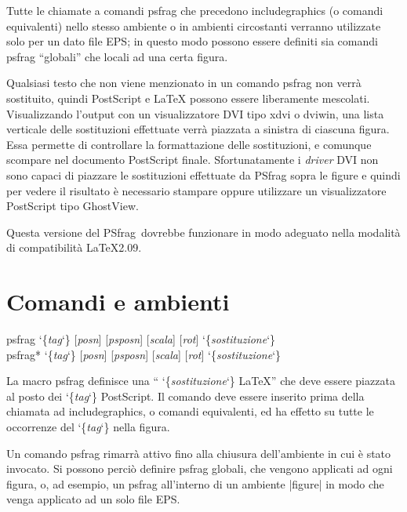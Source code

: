 \documentclass[a4paper,11pt]{ltxguide}
\let\pkg\textsf
\newcommand{\pfg}{\pkg{PSfrag}}
\def\cs#1{%
  {\ttfamily\expandafter\string\csname #1\endcsname}}
\providecommand\marg[1]{%
  {\ttfamily\char`\{}{\em#1\/}{\ttfamily\char`\}}}
\providecommand\oarg[1]{%
  {\ttfamily[}{\em #1\/}{\ttfamily]}}
\begin{document}
Tutte le chiamate a comandi \cs{psfrag} che precedono \cs{includegraphics}
(o comandi equivalenti) nello stesso ambiente o in ambienti circostanti
verranno utilizzate solo per un dato file EPS; in questo modo
possono essere definiti sia comandi \cs{psfrag} ``globali'' che locali ad una 
certa figura.

Qualsiasi testo che non viene menzionato in un comando \cs{psfrag} non
verr\`a sostituito, quindi PostScript e \LaTeX{} possono essere
liberamente mescolati.  Visualizzando l'output con un visualizzatore
DVI tipo \pkg{xdvi} o \pkg{dviwin}, una lista verticale delle
sostituzioni effettuate verr\`a piazzata a sinistra di ciascuna
figura.  Essa permette di controllare la formattazione delle
sostituzioni, e comunque scompare nel documento PostScript finale.
Sfortunatamente i \emph{driver} DVI non sono capaci di piazzare le
sostituzioni effettuate da \pfg{} sopra le figure e quindi per vedere
il risultato \`e necessario stampare oppure utilizzare un
visualizzatore PostScript tipo GhostView.

Questa versione del \pfg\ dovrebbe funzionare in modo adeguato
nella modalit\`a di compatibilit\`a \LaTeX2.09. 

\section{Comandi e ambienti}\label{sec:pos}

\begin{decl}
\cs{psfrag}\marg{tag}\oarg{posn}\oarg{psposn}%
        \oarg{scala}\oarg{rot}\marg{sostituzione}\\
\cs{psfrag*}\marg{tag}\oarg{posn}\oarg{psposn}%
        \oarg{scala}\oarg{rot}\marg{sostituzione}
\end{decl}

La macro \cs{psfrag} definisce una ``\marg{sostituzione} \LaTeX{}''  che deve
essere piazzata al posto dei \marg{tag} PostScript. Il comando
deve essere inserito prima della chiamata ad \cs{includegraphics}, o comandi
equivalenti, ed ha effetto su tutte le occorrenze del \marg{tag} nella
figura. 

Un comando \cs{psfrag} rimarr\`a attivo fino alla chiusura dell'ambiente
in cui \`e stato invocato.
Si possono perci\`o definire \cs{psfrag} globali, che vengono
applicati ad ogni figura, o, ad esempio, un \cs{psfrag} all'interno di
un ambiente |figure| in modo che venga applicato ad un solo
file EPS.
\end{document}
